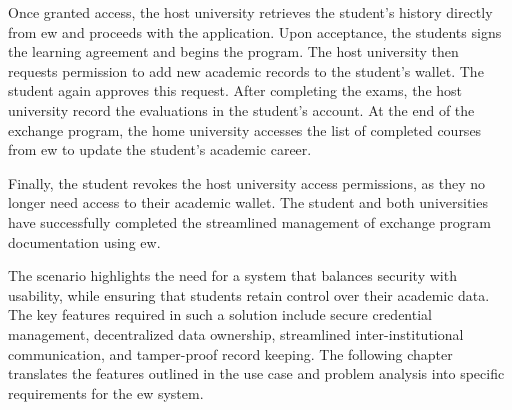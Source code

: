 Once granted access, the host university retrieves the student's history directly from \gls{ew} and proceeds with the application. Upon acceptance, the students signs the learning agreement and begins the program. The host university then requests permission to add new academic records to the student's wallet. The student again approves this request.
After completing the exams, the host university record the evaluations in the student's account. At the end of the exchange program, the home university accesses the list of completed courses from \gls{ew} to update the student's academic career.

Finally, the student revokes the host university access permissions, as they no longer need access to their academic wallet. The student and both universities have successfully completed the streamlined management of exchange program documentation using \gls{ew}. 

The scenario highlights the need for a system that balances security with usability, while ensuring that students retain control over their academic data. The key features required in such a solution include secure credential management, decentralized data ownership, streamlined inter-institutional communication, and tamper-proof record keeping. The following chapter translates the features outlined in the use case and problem analysis into specific requirements for the \gls{ew} system.